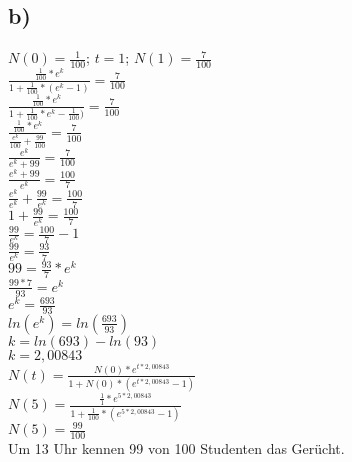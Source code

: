\documentclass{article}
\begin{document}
	\subsection*{b)}
	$N(0) = \frac{1}{100}$; $t = 1$; $N(1) = \frac{7}{100}$ \\
	$\frac{\frac{1}{100}*e^k}{1 + \frac{1}{100}*(e^k - 1)} = \frac{7}{100}$ \\
	$\frac{\frac{1}{100}*e^k}{1 + \frac{1}{100}*e^k - \frac{1}{100} )} = \frac{7}{100}$ \\
	$\frac{\frac{1}{100}*e^k}{\frac{e^k}{100} + \frac{99}{100}} = \frac{7}{100}$ \\
	$\frac{e^k}{e^k + 99} = \frac{7}{100}$ \\
	$\frac{e^k + 99}{e^k} = \frac{100}{7}$ \\
	$\frac{e^k}{e^k} + \frac{99}{e^k} = \frac{100}{7}$ \\
	$1 + \frac{99}{e^k} = \frac{100}{7}$ \\
	$\frac{99}{e^k} = \frac{100}{7} - 1$ \\
	$\frac{99}{e^k} = \frac{93}{7}$ \\
	$99 = \frac{93}{7} * e^k$ \\
	$ \frac{99 * 7}{93} = e^k$ \\
	$e^k = \frac{693}{93}$ \\
	$ln(e^k) = ln(\frac{693}{93})$ \\
	$k = ln(693) - ln(93)$ \\
	$k = 2,00843$ \\
	$N(t) = \frac{N(0) * e^{t * 2,00843}}{1 + N(0)*(e^{t* 2,00843}-1)}$ \\
	$N(5) = \frac{\frac{1}{1} * e^{5 * 2,00843}}{1 + \frac{1}{100}*(e^{5* 2,00843}-1)}$ \\
	$N(5) = \frac{99}{100}$ \\
	Um 13 Uhr kennen 99 von 100 Studenten das Gerücht.
\end{document}
